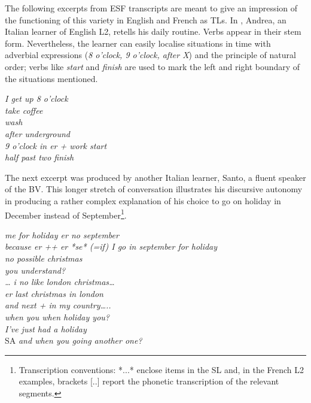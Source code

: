 \documentclass[output=paper]{langscibook}
\begin{document}
The following excerpts from ESF transcripts are meant to give an impression of the functioning of this variety in English and French as TLs. In , Andrea, an Italian learner of English L2, retells his daily routine. Verbs appear in their stem form. Nevertheless, the learner can easily localise situations in time with adverbial expressions (\textit{8 o’clock, 9 o’clock, after X}) and the principle of natural order; verbs like \textit{start} and \textit{finish} are used to mark the left and right boundary of the situations mentioned. 

\ea%
    \label{ex:benazzo:1}
      \textit{I get up 8 o’clock}\\
            {} \textit{take coffee} \\
      {}  \textit{wash}\\
    {} \textit{after underground}\\
    {} \textit{9 o’clock in er + work start} \\
    {} \textit{half past two finish}\\
    \z

The next excerpt was produced by another Italian learner, Santo, a fluent speaker of the BV. This longer stretch of conversation illustrates his discursive autonomy in producing a rather complex explanation of his choice to go on holiday in December instead of September\footnote{ {Transcription conventions:  *...* enclose items in the SL and, in the French L2 examples, brackets [..] report the phonetic transcription of the relevant segments.}}.

\ea%
    \label{ex:benazzo:2}
    \hphantom{Speakerw}  \textit{me for holiday er no september} \\
        {} \textit{because er ++ er *se* (=if) I go in september for holiday} \\
    {} \textit{no possible christmas} \\
    {} \textit{you understand?} \\
    {} \textit{… i no like london christmas…} \\
    {} \textit{er last christmas in london} \\
    {} \textit{and next + in my country…..} \\
    {} \textit{when you when holiday you?}   \\
    
        \textit{I’ve just had a holiday} \\
  SA  \textit{and when you going another one?} \\
  \z
\end{document}
